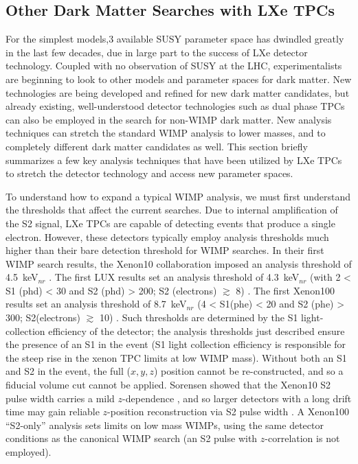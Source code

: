 \subsection{Other Dark Matter Searches with LXe TPCs}
\label{sec:non_wimp_searches_with_lxetpcs}
For the simplest models,3 available \ac{SUSY} parameter space has dwindled greatly in the last few decades, due in large part to the success of \ac{LXe} detector technology. Coupled with no observation of \ac{SUSY} at the \ac{LHC}, experimentalists are beginning to look to other models and parameter spaces for dark matter. New technologies are being developed and refined for new dark matter candidates, but already existing, well-understood detector technologies such as dual phase \ac{TPC}s can also be employed in the search for non-\ac{WIMP} dark matter. New analysis techniques can stretch the standard \ac{WIMP} analysis to lower masses, and to completely different dark matter candidates as well. This section briefly summarizes a few key analysis techniques that have been utilized by \ac{LXe} \ac{TPC}s to stretch the detector technology and access new parameter spaces. 

To understand how to expand a typical \ac{WIMP} analysis, we must first understand the thresholds that affect the current searches. Due to internal amplification of the S2 signal, \ac{LXe} \ac{TPC}s are capable of detecting events that produce a single electron. However, these detectors typically employ analysis thresholds much higher than their bare detection threshold for \ac{WIMP} searches. In their first \ac{WIMP} search results, the Xenon10 collaboration imposed an analysis threshold of 4.5~keV$_{nr}$ \cite{Xenon10WIMP}. The first \ac{LUX} results set an analysis threshold of 4.3~keV$_{nr}$ (with 2 < S1 (phd) < 30 and S2 (phd) > 200; S2 (electrons) $\gtrsim$ 8) \cite{LUXFirstResults}. The first Xenon100 results set an analysis threshold of 8.7~keV$_{nr}$ (4 < S1(phe) < 20 and S2 (phe) > 300; S2(electrons) $\gtrsim$ 10) \cite{Xenon100FirstResults}. Such thresholds are determined by the S1 light-collection efficiency of the detector; the analysis thresholds just described ensure the presence of an S1 in the event (S1 light collection efficiency is responsible for the steep rise in the xenon \ac{TPC} limits at low \ac{WIMP} mass). Without both an S1 and S2 in the event, the full ($x,y,z$) position cannot be re-constructed, and so a fiducial volume cut cannot be applied. Sorensen showed that the Xenon10 S2 pulse width carries a mild $z$-dependence \cite{Sorensen2010}, and so larger detectors with a long drift time may gain reliable $z$-position reconstruction via S2 pulse width \cite{SorensenS2Width}. A Xenon100 ``S2-only'' analysis sets limits on low mass \ac{WIMP}s, using the same detector conditions as the canonical \ac{WIMP} search \cite{Aprile2016} (an S2 pulse with $z$-correlation is not employed).  

